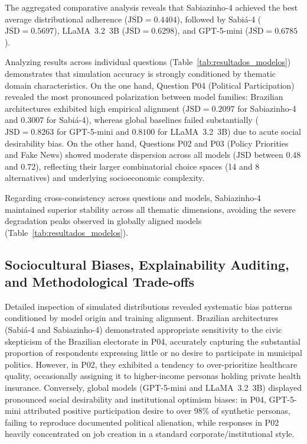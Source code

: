 The aggregated comparative analysis reveals that Sabiazinho-4 achieved
the best average distributional adherence ($\overline{\text{JSD}} = 0.4404$),
followed by Sabiá-4 ($\overline{\text{JSD}} = 0.5697$),
LLaMA~3.2~3B ($\overline{\text{JSD}} = 0.6298$), and
GPT-5-mini ($\overline{\text{JSD}} = 0.6785$).

Analyzing results across individual questions (Table~\ref{tab:resultados_modelos}) demonstrates
that simulation accuracy is strongly conditioned by thematic domain characteristics.
On the one hand, Question P04 (Political Participation) revealed the most pronounced
polarization between model families: Brazilian architectures exhibited high empirical
alignment ($\text{JSD} = 0.2097$ for Sabiazinho-4 and $0.3007$ for Sabiá-4), whereas
global baselines failed substantially ($\text{JSD} = 0.8263$ for GPT-5-mini and
$0.8100$ for LLaMA~3.2~3B) due to acute social desirability bias. On the other hand,
Questions P02 and P03 (Policy Priorities and Fake News) showed moderate dispersion
across all models ($\text{JSD}$ between $0.48$ and $0.72$), reflecting their larger
combinatorial choice spaces (14 and 8 alternatives) and underlying socioeconomic
complexity.

Regarding cross-consistency across questions and models, Sabiazinho-4
maintained superior stability across all thematic dimensions, avoiding the
severe degradation peaks observed in globally aligned models
(Table~\ref{tab:resultados_modelos}).

\subsection{Sociocultural Biases, Explainability Auditing, and Methodological Trade-offs}
\label{subsec:discussao_qualitativa}

Detailed inspection of simulated distributions revealed systematic bias
patterns conditioned by model origin and training alignment. Brazilian
architectures (Sabiá-4 and Sabiazinho-4) demonstrated appropriate sensitivity to
the civic skepticism of the Brazilian electorate in P04, accurately capturing
the substantial proportion of respondents expressing little or no desire to
participate in municipal politics. However, in P02, they exhibited a tendency to
over-prioritize healthcare quality, occasionally assigning it to higher-income
personas holding private health insurance. Conversely, global models (GPT-5-mini
and LLaMA~3.2~3B) displayed pronounced social desirability and institutional
optimism biases: in P04, GPT-5-mini attributed positive participation desire to
over 98\% of synthetic personas, failing to reproduce documented political
alienation, while responses in P02 heavily concentrated on job creation in a
standard corporate/institutional style.


